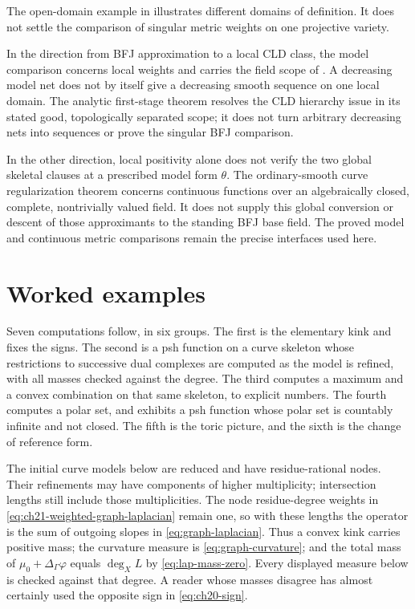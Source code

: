 \begin{remark}
\label{rem:ch21-no-separating-example}
The open-domain example in  illustrates
different domains of definition.  It does not settle the comparison of
singular metric weights on one projective variety.

In the direction from BFJ approximation to a local CLD class, the model
comparison concerns local weights and carries the field scope of
.  A decreasing model net does not by
itself give a decreasing smooth sequence on one local domain.
The analytic first-stage theorem resolves the CLD hierarchy issue in its
stated good, topologically separated scope; it does not turn arbitrary
decreasing nets into sequences or prove the singular BFJ comparison.

In the other direction, local positivity alone does not verify the two
global skeletal clauses at a prescribed model form $\theta$.
The ordinary-smooth curve regularization theorem
 concerns continuous
functions over an algebraically closed, complete, nontrivially valued
field.  It does not supply this global conversion or descent of those
approximants to the standing BFJ base field.  The proved model and
continuous metric comparisons remain the precise interfaces used here.
\end{remark}

\section{Worked examples}
\label{sec:ch21-worked}

Seven computations follow, in six groups.  The first is the elementary kink and fixes the
signs.  The second is a psh function on a curve skeleton whose restrictions
to successive dual complexes are computed as the model is refined, with all
masses checked against the degree.  The third computes a maximum and a
convex combination on that same skeleton, to explicit numbers.  The fourth
computes a polar set, and exhibits a psh function whose polar set is
countably infinite and not closed.  The fifth is the toric picture, and the
sixth is the change of reference form.

The initial curve models below are reduced and have residue-rational
nodes.  Their refinements may have components of higher multiplicity;
intersection lengths still include those multiplicities.  The node
residue-degree weights in \eqref{eq:ch21-weighted-graph-laplacian} remain
one, so with these lengths the operator is the sum of outgoing slopes
in \eqref{eq:graph-laplacian}.  Thus a convex kink carries positive mass; the curvature measure is
\eqref{eq:graph-curvature}; and the total mass of
$\mu_0+\Delta_\Gamma\varphi$ equals $\deg_XL$ by
\eqref{eq:lap-mass-zero}.  Every displayed measure below is checked against
that degree.  A reader whose masses disagree has almost certainly used the
opposite sign in \eqref{eq:ch20-sign}.

